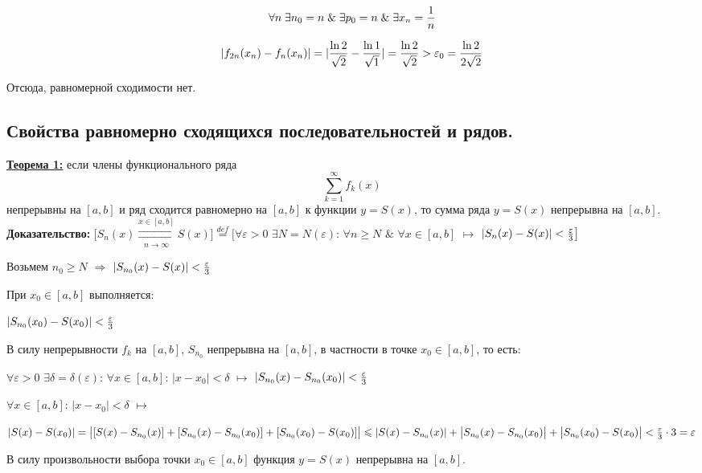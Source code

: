 \documentclass[a4paper,12pt]{article} %
\renewcommand {\geq}{\geqslant}
\renewcommand {\leq}{\leqslant}
\begin{document}
$$\forall n \; \exists n_0 = n \; \& \; \exists p_0 = n \; \& \; \exists x_n = {1 \over n}$$

$$|f_{2n}(x_n) - f_n(x_n)| = |{\ln{2}\over{\sqrt{2}}} - {\ln{1}\over{\sqrt{1}}}| = {\ln{2}\over{\sqrt{2}}} > \varepsilon_0 = {\ln{2}\over{2\sqrt{2}}}$$

Отсюда, равномерной сходимости нет.


\subsection{Свойства равномерно сходящихся последовательностей и рядов.}

\underline{\textbf{Теорема 1:}} если члены функционального ряда $$\sum\limits_{k = 1}^{\infty}  f_k(x)$$   непрерывны на $[a,b]$ и ряд сходится равномерно на $[a,b]$ к функции $y = S(x)$, то сумма ряда 
$y = S(x)$ непрерывна на $[a,b]$. \\

\textbf{Доказательство:} \newline
$\big[S_n(x) \overset{x \in [a,b]}{\underset{n \rightarrow \infty}{\rightrightarrows}} S(x)\big]\stackrel{def}{=} \big[ \forall \varepsilon > 0 $  $\exists N = N(\varepsilon)$: $\forall n \geq N$  $\&$  $\forall x \in [a,b]$ $\longmapsto$ $|S_n(x) -S(x)| < {\varepsilon \over 3} \big]$

Возьмем $n_0 \geq N$ $\Rightarrow$ $|S_{n_0}(x)-S(x)| < {\varepsilon \over 3}$

При $x_0 \in [a,b]$ выполняется:

$|S_{n_0}(x_0)-S(x_0)| < {\varepsilon \over 3}$

В силу непрерывности $f_k$ на $[a,b]$, $S_{n_0}$ непрерывна на $[a,b]$, в частности в точке $x_0 \in [a,b]$, то есть:

$\forall \varepsilon > 0$ $\exists \delta = \delta(\varepsilon)$: $\forall x \in [a,b]$:  $|x-x_0|<\delta$ $\longmapsto$ $|S_{n_0}(x) - S_{n_0}(x_0)| < {\varepsilon \over 3}$

$\forall x \in [a,b]$: $|x-x_0|<\delta$ $\longmapsto$ 
\newline

$|S(x) - S(x_0)| = \big| [S(x)-S_{n_0}(x)] + [S_{n_0}(x)-S_{n_0}(x_0)] + [S_{n_0}(x_0)-S(x_0)]\big| \leq |S(x)-S_{n_0}(x)| + \big| S_{n_0}(x)-S_{n_0}(x_0)\big| + \big|S_{n_0}(x_0) - S(x_0)\big| < {\varepsilon \over 3} \cdot 3 = \varepsilon$

 В силу произвольности выбора точки $x_0 \in [a,b]$ функция $y = S(x)$ непрерывна на $[a,b]$.\\
\end{document}
